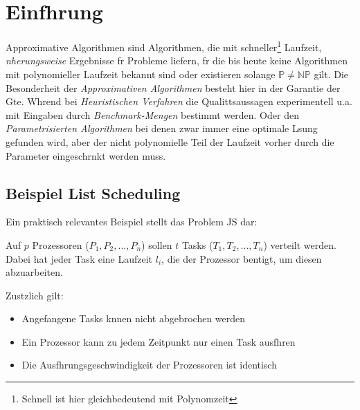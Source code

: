\documentclass[12pt, a4paper, twoside]{scrartcl}
\begin{document}
\cleardoublepage


\tableofcontents

\cleardoublepage

\pagestyle{headings} 
\pagestyle{fancy}


\nocite{coanap}
\nocite{aee}
\nocite{wanka}

\section{Einfhrung} %
Approximative Algorithmen sind Algorithmen, die mit schneller\footnote{Schnell ist hier gleichbedeutend mit Polynomzeit} Laufzeit, \emph{nherungsweise} Ergebnisse fr Probleme liefern, fr die bis heute keine Algorithmen mit polynomieller Laufzeit bekannt sind oder existieren solange $\mathbb P \neq \mathbb{NP}$ gilt. Die Besonderheit der \emph{Approximativen Algorithmen} besteht hier in der \glqq Garantie\grqq{} der Gte. Whrend bei \emph{Heuristischen Verfahren} die Qualittsaussagen experimentell u.a. mit Eingaben durch \emph{Benchmark-Mengen} bestimmt werden. Oder den \emph{Parametrisierten Algorithmen} bei denen zwar immer eine optimale Lsung gefunden wird, aber der nicht polynomielle Teil der Laufzeit vorher durch die Parameter eingeschrnkt werden muss.\\
\subsection{Beispiel List Scheduling}

Ein praktisch relevantes Beispiel stellt das Problem \ac{JS} dar:

\begin{example}
	 Auf $p$ Prozessoren ($P_1,P_2,...,P_n$) sollen $t$ Tasks ($T_1,T_2,...,T_n$) verteilt werden. Dabei hat jeder Task eine Laufzeit $l_i$, die der Prozessor bentigt, um diesen abzuarbeiten. 
\end{example}

Zustzlich gilt: 
\begin{itemize}
	\setlength{\parskip}{0.5pt}
	\item Angefangene Tasks knnen nicht abgebrochen werden
	\item Ein Prozessor kann zu jedem Zeitpunkt nur einen Task ausfhren
	\item Die Ausfhrungsgeschwindigkeit der Prozessoren ist identisch
\end{itemize}
\end{document}
